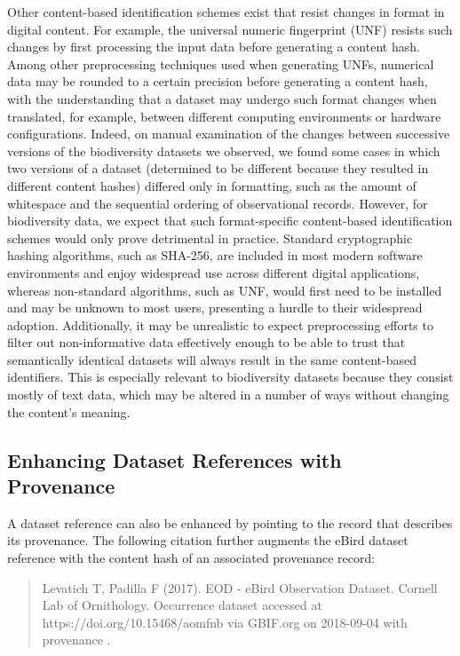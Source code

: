 Other content-based identification schemes exist that resist changes in format in digital content. For example, the universal numeric fingerprint (UNF) \citep{Altman_2007} resists such changes by first processing the input data before generating a content hash. Among other preprocessing techniques used when generating UNFs, numerical data may be rounded to a certain precision before generating a content hash, with the understanding that a dataset may undergo such format changes when translated, for example, between different computing environments or hardware configurations. Indeed, on manual examination of the changes between successive versions of the biodiversity datasets we observed, we found some cases in which two versions of a dataset (determined to be different because they resulted in different content hashes) differed only in formatting, such as the amount of whitespace and the sequential ordering of observational records. However, for biodiversity data, we expect that such format-specific content-based identification schemes would only prove detrimental in practice. Standard cryptographic hashing algorithms, such as SHA-256, are included in most modern software environments and enjoy widespread use across different digital applications, whereas non-standard algorithms, such as UNF, would first need to be installed and may be unknown to most users, presenting a hurdle to their widespread adoption. Additionally, it may be unrealistic to expect preprocessing efforts to filter out non-informative data effectively enough to be able to trust that semantically identical datasets will always result in the same content-based identifiers. This is especially relevant to biodiversity datasets because they consist mostly of text data, which may be altered in a number of ways without changing the content’s meaning.

\subsection*{Enhancing Dataset References with Provenance}
A dataset reference can also be enhanced by pointing to the record that describes its provenance. The following citation further augments the eBird dataset reference with the content hash of an associated provenance record:

\begin{quote}
Levatich T, Padilla F (2017). EOD - eBird Observation Dataset. Cornell Lab of Ornithology. Occurrence dataset  accessed at https://doi.org/10.15468/aomfnb via GBIF.org on 2018-09-04 with provenance .
\end{quote}

